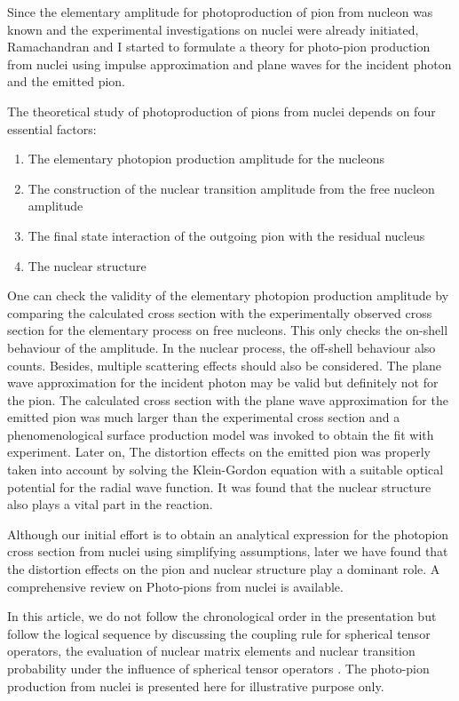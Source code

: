 Since the elementary amplitude for photoproduction of pion from nucleon was known and the experimental investigations on nuclei were already initiated, Ramachandran and I \cite{chap3-key4, chap3-key5} started to formulate a theory for photo-pion production from nuclei using impulse approximation and plane waves for the incident photon and the emitted pion.

The theoretical study of photoproduction of pions from nuclei depends on four essential factors:
\begin{enumerate}
\item The elementary photopion production amplitude for the nucleons
\item The construction of the nuclear transition amplitude from the free nucleon amplitude
\item The final state interaction of the outgoing pion with the residual nucleus
\item The nuclear structure
\end{enumerate}

One can check the validity of the elementary photopion production amplitude by comparing the calculated cross section with the experimentally observed cross section for the elementary process on free nucleons. This only checks the on-shell behaviour of the amplitude. In the nuclear process, the off-shell behaviour also counts. Besides, multiple scattering effects should also be considered. The plane wave approximation for the incident photon may be valid but definitely not for the pion. The calculated cross section with the plane wave approximation for the emitted pion was much larger than the experimental cross section and a phenomenological surface production model \cite{chap3-key19} was invoked to obtain the fit with experiment. Later on, The distortion effects on the emitted pion \cite{chap3-key20,chap3-key21} was properly taken into account by solving the Klein-Gordon equation with a suitable optical potential for the radial wave function. It was found that the nuclear structure also plays a vital part in the reaction.

Although our initial effort is to obtain an analytical expression for the photopion cross section from nuclei using simplifying assumptions, later we have found that the distortion effects on the pion and nuclear structure play a dominant role. A comprehensive review \cite{chap3-key22} on Photo-pions from nuclei is available. 

In this article, we do not follow the chronological order in the presentation but follow the logical sequence by discussing the coupling rule for spherical tensor operators, the evaluation of nuclear matrix elements and nuclear transition probability under the influence of spherical tensor operators \cite{chap3-key12}. The photo-pion production from nuclei is presented here for illustrative purpose only.

